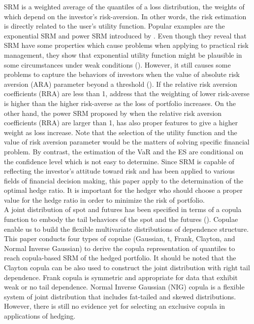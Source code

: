 \documentclass[11pt,a4paper,english]{article}
\begin{document}
SRM is a weighted average of the quantiles of a loss distribution, the weights of which depend on the investor's risk-aversion.  In other words, the risk estimation is directly related to the user's utility  function. Popular examples are the exponential SRM and power SRM introduced by {\color{blue}\citet{dowd2008spectral}}.  Even though they reveal that SRM have some properties which cause problems when applying to practical risk management, they show that exponential utility function might be plausible in some circumstances under weak conditions ({\color{blue}\citealp{buhlmann1980economic}}). However, it still causes some problems to capture the behaviors of investors when the value of absolute risk aversion (ARA) parameter beyond a threshold ({\color{blue}\citealp{markowitz2014mean}}). If the relative risk aversion coefficients (RRA) are less than 1, {\color{blue}\citet{dowd2008spectral}} address that the weighting of lower risk-averse is higher than the higher risk-averse as the loss of portfolio increases. On the other hand, the power SRM proposed by {\color{blue}\citet{dowd2008spectral}} when the relative risk aversion coefficients (RRA) are larger than 1, has also proper features to give a higher weight as loss increase. Note that the selection of the utility function and the value of risk aversion parameter would be the matters of solving specific financial problem. By contrast, the estimation of the VaR and the ES are conditional on the confidence level which is not easy to determine. Since SRM is capable of reflecting the investor's attitude toward risk and has been applied to various fields of financial decision making, this paper apply to the determination of the optimal hedge ratio. It is important for the hedger who should choose a proper value for the hedge ratio in order to minimize the risk of portfolio.\\

A joint distribution of spot and futures has been specified in terms of a copula function to embody the tail behaviors of the spot and the futures ({\color{blue}\citealp{barbi2014copula}}). Copulae enable us to build the flexible multivariate distributions of dependence structure. This paper conducts four types of copulae (Gaussian, t, Frank, Clayton, and Normal Inverse Gaussian) to derive the copula representation of quantiles to reach copula-based SRM of the hedged portfolio. It should be noted that the Clayton copula can be also used to construct the joint distribution with right tail dependence. Frank copula is symmetric and appropriate for data that exhibit weak or no tail dependence. Normal Inverse Gaussian (NIG) copula is a flexible system of joint distribution that includes fat-tailed and skewed distributions. However, there is still no evidence yet for selecting an exclusive copula in applications of hedging.\\
\end{document}
